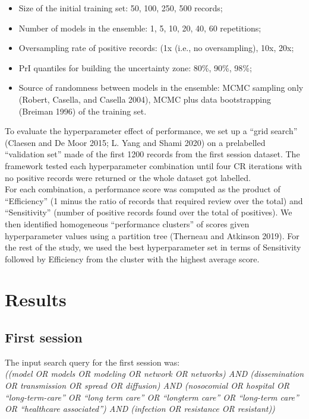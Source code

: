 \documentclass{article}
\begin{document}
\begin{itemize}
\tightlist
\item
  Size of the initial training set: 50, 100, 250, 500 records;
\item
  Number of models in the ensemble: 1, 5, 10, 20, 40, 60 repetitions;
\item
  Oversampling rate of positive records: (1x (i.e., no oversampling),
  10x, 20x;
\item
  PrI quantiles for building the uncertainty zone: 80\%, 90\%, 98\%;
\item
  Source of randomness between models in the ensemble: MCMC sampling
  only (Robert, Casella, and Casella 2004), MCMC plus data bootstrapping
  (Breiman 1996) of the training set.
\end{itemize}

To evaluate the hyperparameter effect of performance, we set up a ``grid
search'' (Claesen and De Moor 2015; L. Yang and Shami 2020) on a
prelabelled ``validation set'' made of the first 1200 records from the
first session dataset. The framework tested each hyperparameter
combination until four CR iterations with no positive records were
returned or the whole dataset got labelled.\\
For each combination, a performance score was computed as the product of
``Efficiency'' (1 minus the ratio of records that required review over
the total) and ``Sensitivity'' (number of positive records found over
the total of positives). We then identified homogeneous ``performance
clusters'' of scores given hyperparameter values using a partition tree
(Therneau and Atkinson 2019). For the rest of the study, we used the
best hyperparameter set in terms of Sensitivity followed by Efficiency
from the cluster with the highest average score.

\hypertarget{results}{%
\section{Results}\label{results}}

\hypertarget{first-session}{%
\subsection{First session}\label{first-session}}

The input search query for the first session was:\\

\emph{((model OR models OR modeling OR network OR networks) AND
(dissemination OR transmission OR spread OR diffusion) AND (nosocomial
OR hospital OR ``long-term-care'' OR ``long term care'' OR ``longterm
care'' OR ``long-term care'' OR ``healthcare associated'') AND
(infection OR resistance OR resistant))}
\end{document}
